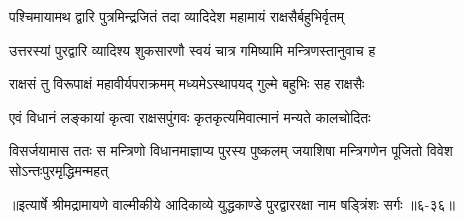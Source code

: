 \twolineshloka
{पश्चिमायामथ द्वारि पुत्रमिन्द्रजितं तदा}
{व्यादिदेश महामायं राक्षसैर्बहुभिर्वृतम्} %

\twolineshloka
{उत्तरस्यां पुरद्वारि व्यादिश्य शुकसारणौ}
{स्वयं चात्र गमिष्यामि मन्त्रिणस्तानुवाच ह} %

\twolineshloka
{राक्षसं तु विरूपाक्षं महावीर्यपराक्रमम्}
{मध्यमेऽस्थापयद् गुल्मे बहुभिः सह राक्षसैः} %

\twolineshloka
{एवं विधानं लङ्कायां कृत्वा राक्षसपुंगवः}
{कृतकृत्यमिवात्मानं मन्यते कालचोदितः} %

\twolineshloka
{विसर्जयामास ततः स मन्त्रिणो विधानमाज्ञाप्य पुरस्य पुष्कलम्}
{जयाशिषा मन्त्रिगणेन पूजितो विवेश सोऽन्तःपुरमृद्धिमन्महत्} %


॥इत्यार्षे श्रीमद्रामायणे वाल्मीकीये आदिकाव्ये युद्धकाण्डे पुरद्वाररक्षा नाम षड्त्रिंशः सर्गः ॥६-३६॥
